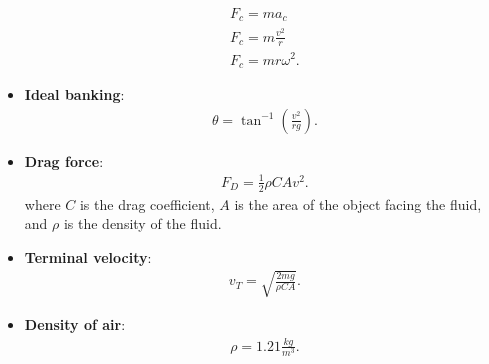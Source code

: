 \documentclass{report}
\begin{document}
\begin{itemize}
            \begin{align*}
                F_{c} = ma_{c} \\
                F_{c} = m \frac{v^{2}}{r} \\
                F_{c} = mr\omega^{2}
            .\end{align*}
        \item \textbf{Ideal banking}:
            \begin{align*}
                \theta  = \tan^{-1}{\left(\frac{v^{2}}{rg}\right)}
            .\end{align*}
        \item \textbf{Drag force}:
            \begin{align*}
                F_{D} = \frac{1}{2}\rho CAv^{2}
            .\end{align*}
            where $C$ is the drag coefficient, $A$ is the area of the object facing the fluid, and $\rho$ is the density of the fluid.
        \item \textbf{Terminal velocity}:
            \begin{align*}
                v_{T} = \sqrt{\frac{2mg}{\rho CA}}
            .\end{align*}
        \item \textbf{Density of air}:
            \begin{align*}
                \rho = 1.21 \frac{kg}{m^{3}}
            .\end{align*}
    \end{itemize}

    \pagebreak 
\end{document}
